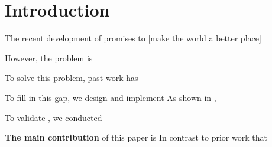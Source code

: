 \section{Introduction}

The recent development of \xx promises to [make the world a better place] \xxx

However, the problem is \xxx

To solve this problem, past work has \xxx

To fill in this gap, we design and implement \xxx
As shown in , \xxx

To validate \xx, we conducted \xxx

{\bf The main contribution} of this paper is \xxx
In contrast to prior work that \xxx